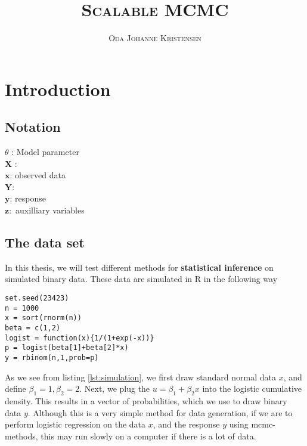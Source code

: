 \documentclass{article}
\title{\textsc{Scalable MCMC}}
\author{\textsc{Oda Johanne Kristensen}}
\date{}
\theoremstyle{definition}
\begin{document}
\maketitle
\section{Introduction}
\subsection{Notation}
$\theta$ : Model parameter \\
$\mathbf{X}$ : \\
$\mathbf{x}$: observed data \\
$\mathbf{Y}$: \\
$\mathbf{y}$: response \\
$\mathbf{z}:$ auxilliary variables 
\subsection{The data set}\label{subsec:data}
In this thesis, we will test different methods for \textbf{statistical inference} on simulated binary data. These data are simulated in R in the following way
\begin{lstlisting}[caption={simulation of binary data}, label={lst:simulation}]
set.seed(23423)
n = 1000
x = sort(rnorm(n))
beta = c(1,2)
logist = function(x){1/(1+exp(-x))}
p = logist(beta[1]+beta[2]*x)
y = rbinom(n,1,prob=p)
\end{lstlisting}
As we see from listing \ref{lst:simulation}, we first draw standard normal data $x$, and define $\beta_1 = 1, \beta_2 = 2$. Next, we plug the  $u = \beta_1 + \beta_2 x$ into the logistic cumulative density. This results in a vector of probabilities, which we use to draw binary data $y$. Although this is a very simple method for data generation, if we are to perform logistic regression on the data $x$, and the response $y$ using \gls{mcmc}-methods, this may run slowly on a computer if there is a lot of data.
\end{document}
